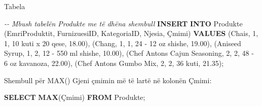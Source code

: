 \documentclass[
  ignorenonframetext,
]{beamer}
\newenvironment{Shaded}{\begin{snugshade}}{\end{snugshade}}
\newcommand{\CharTok}[1]{\textcolor[rgb]{0.31,0.60,0.02}{#1}}
\newcommand{\CommentTok}[1]{\textcolor[rgb]{0.56,0.35,0.01}{\textit{#1}}}
\newcommand{\DecValTok}[1]{\textcolor[rgb]{0.00,0.00,0.81}{#1}}
\newcommand{\FloatTok}[1]{\textcolor[rgb]{0.00,0.00,0.81}{#1}}
\newcommand{\FunctionTok}[1]{\textcolor[rgb]{0.13,0.29,0.53}{\textbf{#1}}}
\newcommand{\KeywordTok}[1]{\textcolor[rgb]{0.13,0.29,0.53}{\textbf{#1}}}
\newcommand{\NormalTok}[1]{#1}
\newcommand{\StringTok}[1]{\textcolor[rgb]{0.31,0.60,0.02}{#1}}
\begin{document}
\begin{frame}[fragile]{Tabela}
\label{tabela-3}

\begin{Shaded}
\begin{Highlighting}[]
\CommentTok{{-}{-} Mbush tabelën Produkte me të dhëna shembull}
\KeywordTok{INSERT} \KeywordTok{INTO}\NormalTok{ Produkte (EmriProduktit, FurnizuesiID, KategoriaID, Njesia, Çmimi)}
\KeywordTok{VALUES} 
\NormalTok{(}\StringTok{\textquotesingle{}Chais\textquotesingle{}}\NormalTok{, }\DecValTok{1}\NormalTok{, }\DecValTok{1}\NormalTok{, }\StringTok{\textquotesingle{}10 kuti x 20 qese\textquotesingle{}}\NormalTok{, }\FloatTok{18.00}\NormalTok{),}
\NormalTok{(}\StringTok{\textquotesingle{}Chang\textquotesingle{}}\NormalTok{, }\DecValTok{1}\NormalTok{, }\DecValTok{1}\NormalTok{, }\StringTok{\textquotesingle{}24 {-} 12 oz shishe\textquotesingle{}}\NormalTok{, }\FloatTok{19.00}\NormalTok{),}
\NormalTok{(}\StringTok{\textquotesingle{}Aniseed Syrup\textquotesingle{}}\NormalTok{, }\DecValTok{1}\NormalTok{, }\DecValTok{2}\NormalTok{, }\StringTok{\textquotesingle{}12 {-} 550 ml shishe\textquotesingle{}}\NormalTok{, }\FloatTok{10.00}\NormalTok{),}
\NormalTok{(}\StringTok{\textquotesingle{}Chef Anton}\CharTok{\textquotesingle{}\textquotesingle{}}\StringTok{s Cajun Seasoning\textquotesingle{}}\NormalTok{, }\DecValTok{2}\NormalTok{, }\DecValTok{2}\NormalTok{, }\StringTok{\textquotesingle{}48 {-} 6 oz kavanoza\textquotesingle{}}\NormalTok{, }\FloatTok{22.00}\NormalTok{),}
\NormalTok{(}\StringTok{\textquotesingle{}Chef Anton}\CharTok{\textquotesingle{}\textquotesingle{}}\StringTok{s Gumbo Mix\textquotesingle{}}\NormalTok{, }\DecValTok{2}\NormalTok{, }\DecValTok{2}\NormalTok{, }\StringTok{\textquotesingle{}36 kuti\textquotesingle{}}\NormalTok{, }\FloatTok{21.35}\NormalTok{);}
\end{Highlighting}
\end{Shaded}
\end{frame}

\begin{frame}[fragile]{Shembull për MAX()}
\label{shembull-puxebr-max}
Gjeni çmimin më të lartë në kolonën Çmimi:

\begin{Shaded}
\begin{Highlighting}[]
\KeywordTok{SELECT} \FunctionTok{MAX}\NormalTok{(Çmimi)}
\KeywordTok{FROM}\NormalTok{ Produkte;}
\end{Highlighting}
\end{Shaded}
\end{frame}
\end{document}
